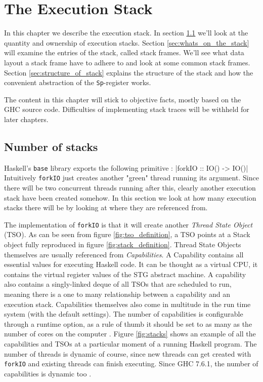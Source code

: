 \chapter{The Execution Stack} \label{chp:the_execution_stack}

In this chapter we describe the execution stack. In section
\ref{sec:number_of_stacks} we'll look at the quantity and ownership of
execution stacks. Section \ref{sec:whats_on_the_stack} will examine the
entries of the stack, called stack frames. We'll see what data layout
a stack frame have to adhere to and look at some common stack
frames. Section \ref{sec:structure_of_stack} explains the structure of
the stack and how the convenient abstraction of the \texttt{Sp}-register
works.

The content in this chapter will stick to objective facts, mostly based
on the GHC source code. Difficulties of implementing stack traces will
be withheld for later chapters.

\section{Number of stacks} \label{sec:number_of_stacks}

Haskell's \texttt{base} library exports the following primitive \cite{base_forkIO}:
|forkIO :: IO() -> IO()|
Intuitively \texttt{forkIO} just creates another "green" thread running its argument.
Since there will be two concurrent threads running after this, clearly
another execution stack have been created somehow. In this section we
look at how many execution stacks there will be by looking at
where they are referenced from.

The implementation of \texttt{forkIO} is
that it will create another \emph{Thread State Object} (TSO). As
can be seen from figure \ref{fig:tso_definition}, a TSO points at a
Stack object fully reproduced in figure \ref{fig:stack_definition}.
Thread State Objects themselves are usually referenced from \emph{Capabilities}.
A Capability contains all essential values for executing
Haskell code. It can be thought as a virtual CPU, it contains
the virtual register values of the STG abstract machine. A capability also contains
a singly-linked deque of all TSOs that are scheduled to run, meaning
there is a one to many relationship between a capability and an execution
stack. Capabilities themselves also come in multitude in the run time
system (with the default settings). The number of
capabilities is configurable through a runtime option, as a rule of
thumb it should be set to as many as the number of cores on the computer
\cite{commentary_capabilities}. Figure \ref{fig:stacks} shows an example
of all the capabilities and TSOs at a particular moment of a running
Haskell program. The number of threads is dynamic of course, since
new threads can get created with \texttt{forkIO} and existing threads
can finish executing. Since GHC 7.6.1, the number of capabilities is
dynamic too \cite{haskell_org_release_7.6.1}.

